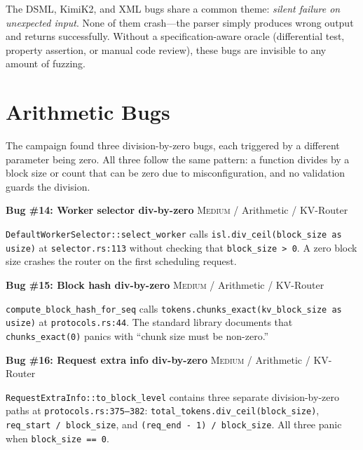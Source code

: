 \begin{notebox}
The DSML, KimiK2, and XML bugs share a common theme: \emph{silent failure on unexpected input}. None of them crash---the parser simply produces wrong output and returns successfully. Without a specification-aware oracle (differential test, property assertion, or manual code review), these bugs are invisible to any amount of fuzzing.
\end{notebox}

\section{Arithmetic Bugs}
\label{sec:findings:arithmetic}

%
The campaign found three division-by-zero bugs, each triggered by a different parameter being zero. All three follow the same pattern: a function divides by a block size or count that can be zero due to misconfiguration, and no validation guards the division.

\begin{bugbox}
\textbf{Bug \#14: Worker selector div-by-zero} \hfill \textsc{Medium} / Arithmetic / KV-Router

\texttt{DefaultWorkerSelector::select\_worker} calls \texttt{isl.div\_ceil(block\_size as usize)} at \texttt{selector.rs:113} without checking that \texttt{block\_size > 0}. A zero block size crashes the router on the first scheduling request.
\end{bugbox}

\begin{bugbox}
\textbf{Bug \#15: Block hash div-by-zero} \hfill \textsc{Medium} / Arithmetic / KV-Router

\texttt{compute\_block\_hash\_for\_seq} calls \texttt{tokens.chunks\_exact(kv\_block\_size as usize)} at \texttt{protocols.rs:44}. The standard library documents that \texttt{chunks\_exact(0)} panics with ``chunk size must be non-zero.''
\end{bugbox}

\begin{bugbox}
\textbf{Bug \#16: Request extra info div-by-zero} \hfill \textsc{Medium} / Arithmetic / KV-Router

\texttt{RequestExtraInfo::to\_block\_level} contains three separate division-by-zero paths at \texttt{protocols.rs:375--382}: \texttt{total\_tokens.div\_ceil(block\_size)}, \texttt{req\_start / block\_size}, and \texttt{(req\_end - 1) / block\_size}. All three panic when \texttt{block\_size == 0}.
\end{bugbox}

